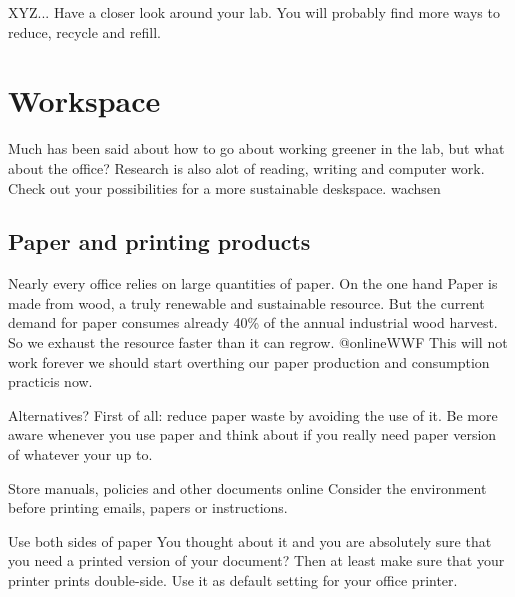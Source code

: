 \begin{suggest}{XYZ...}
	Have a closer look around your lab. You will probably find more ways to reduce, recycle and refill. 
\end{suggest}


\section{Workspace}

 Much has been said about how to go about working greener in the lab, but what about the office? Research is also alot of reading, writing and computer work. Check out your possibilities for a more sustainable deskspace. 
 wachsen
\subsection{Paper and printing products}
	
	Nearly every office relies on large quantities of paper. On the one hand Paper is made from wood, a truly renewable and sustainable resource. But the current demand for paper consumes already 40\% of the annual industrial wood harvest. So we exhaust the resource faster than it can regrow.  @online{WWF} This will not work forever we should start overthing our paper production and consumption practicis now. 

\begin{suggest}{Alternatives?}
	First of all: reduce paper waste by avoiding the use of it. 
	Be more aware whenever you use paper and think about if you really need paper version of whatever your up to. 
	\begin{suggest}{Store manuals, policies and other documents online}
		 Consider the environment before printing emails, papers or instructions. 
	\end{suggest}
\end{suggest}

\begin{suggest}{Use both sides of paper}
	You thought about it and you are absolutely sure that you need a printed version of your document? Then at least make sure that your printer prints double-side. Use it as default setting for your office printer.
\end{suggest}

